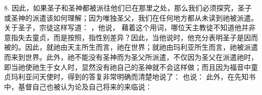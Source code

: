 8. 因此，如果圣子和圣神都被派往他们已在那里之处，那么我们必须探究，圣子或圣神的派遣该如何理解；因为唯独圣父，我们在任何地方都从未读到祂被派遣。关于圣子，宗徒这样写道： ，他说， 藉着这个用词，哪位天主教徒不知道他并非意指失去童贞，而是按照，指性别差异？因此，当他说时，他充分表明圣子是因而被的。因此，就祂由天主所生而言，祂在世界；就祂由玛利亚所生而言，祂被派遣而来到世界。此外，祂不能没有圣神而为圣父所派遣，不仅因为圣父在派遣祂时，即当祂使祂生于女人时，显然没有祂自己的圣神就不会这样做；而且因为福音中童贞玛利亚问天使时，得到的答复非常明确而清楚地说了：  也说： 此外，在先知书中，基督自己也被认为论及自己将来的来临说：\par

